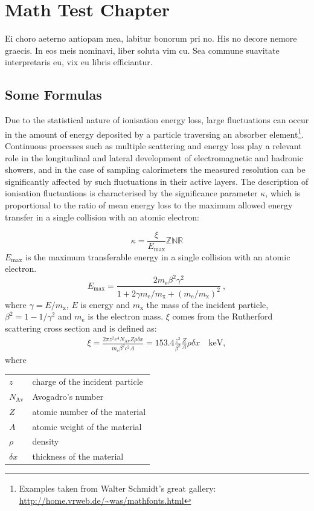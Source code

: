 \chapter{Math Test Chapter}\label{ch:mathtest} %
Ei choro aeterno antiopam mea, labitur bonorum pri no. His no decore
nemore graecis. In eos meis nominavi, liber soluta vim cu. Sea commune
suavitate interpretaris eu, vix eu libris efficiantur.

\section{Some Formulas}
Due to the statistical nature of ionisation energy loss, large
fluctuations can occur in the amount of energy deposited by a particle
traversing an absorber element\footnote{Examples taken from Walter
Schmidt's great gallery: \\
\url{http://home.vrweb.de/~was/mathfonts.html}}.  Continuous processes
such as multiple
scattering and energy loss play a relevant role in the longitudinal
and lateral development of electromagnetic and hadronic
showers, and in the case of sampling calorimeters the
measured resolution can be significantly affected by such fluctuations
in their active layers.  The description of ionisation fluctuations is
characterised by the significance parameter $\kappa$, which is
proportional to the ratio of mean energy loss to the maximum allowed
energy transfer in a single collision with an atomic electron:

\[
\kappa =\frac{\xi}{E_{\mathrm{max}}} \mathbb{ZNR}
\]
$E_{\mathrm{max}}$ is the maximum transferable energy in a single
collision with
an atomic electron.
\[
E_{\mathrm{max}} =\frac{2 m_{\mathrm{e}} \beta^2\gamma^2 }{1 +
2\gamma m_{\mathrm{e}}/m_{\mathrm{x}} + \left ( m_{\mathrm{e}}
/m_{\mathrm{x}}\right)^2}\ ,
\]
where $\gamma = E/m_{\mathrm{x}}$, $E$ is energy and
$m_{\mathrm{x}}$ the mass of the incident particle,
$\beta^2 = 1 - 1/\gamma^2$ and $m_{\mathrm{e}}$ is the electron mass.
$\xi$ comes from the Rutherford scattering cross section
and is defined as:
\begin{eqnarray*} \xi  = \frac{2\pi z^2 e^4 N_{\mathrm{Av}} Z \rho
\delta x}{m_{\mathrm{e}} \beta^2 c^2 A} =  153.4 \frac{z^2}{\beta^2}
\frac{Z}{A}
  \rho \delta x \quad\mathrm{keV},
\end{eqnarray*}
where

\begin{tabular}{ll}
$z$          & charge of the incident particle \\
$N_{\mathrm{Av}}$     & Avogadro's number \\
$Z$          & atomic number of the material \\
$A$          & atomic weight of the material \\
$\rho$       & density \\
$ \delta x$  & thickness of the material \\
\end{tabular}

